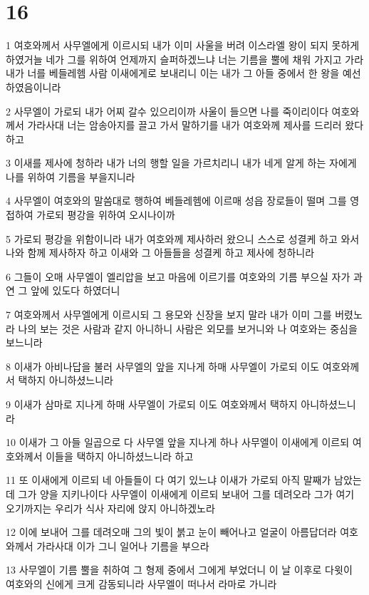 \chapter{16}

\par 1 여호와께서 사무엘에게 이르시되 내가 이미 사울을 버려 이스라엘 왕이 되지 못하게 하였거늘 네가 그를 위하여 언제까지 슬퍼하겠느냐 너는 기름을 뿔에 채워 가지고 가라 내가 너를 베들레헴 사람 이새에게로 보내리니 이는 내가 그 아들 중에서 한 왕을 예선하였음이니라
\par 2 사무엘이 가로되 내가 어찌 갈수 있으리이까 사울이 들으면 나를 죽이리이다 여호와께서 가라사대 너는 암송아지를 끌고 가서 말하기를 내가 여호와께 제사를 드리러 왔다 하고
\par 3 이새를 제사에 청하라 내가 너의 행할 일을 가르치리니 내가 네게 알게 하는 자에게 나를 위하여 기름을 부을지니라
\par 4 사무엘이 여호와의 말씀대로 행하여 베들레헴에 이르매 성읍 장로들이 떨며 그를 영접하여 가로되 평강을 위하여 오시나이까
\par 5 가로되 평강을 위함이니라 내가 여호와께 제사하러 왔으니 스스로 성결케 하고 와서 나와 함께 제사하자 하고 이새와 그 아들들을 성결케 하고 제사에 청하니라
\par 6 그들이 오매 사무엘이 엘리압을 보고 마음에 이르기를 여호와의 기름 부으실 자가 과연 그 앞에 있도다 하였더니
\par 7 여호와께서 사무엘에게 이르시되 그 용모와 신장을 보지 말라 내가 이미 그를 버렸노라 나의 보는 것은 사람과 같지 아니하니 사람은 외모를 보거니와 나 여호와는 중심을 보느니라
\par 8 이새가 아비나답을 불러 사무엘의 앞을 지나게 하매 사무엘이 가로되 이도 여호와께서 택하지 아니하셨느니라
\par 9 이새가 삼마로 지나게 하매 사무엘이 가로되 이도 여호와께서 택하지 아니하셨느니라
\par 10 이새가 그 아들 일곱으로 다 사무엘 앞을 지나게 하나 사무엘이 이새에게 이르되 여호와께서 이들을 택하지 아니하셨느니라 하고
\par 11 또 이새에게 이르되 네 아들들이 다 여기 있느냐 이새가 가로되 아직 말째가 남았는데 그가 양을 지키나이다 사무엘이 이새에게 이르되 보내어 그를 데려오라 그가 여기 오기까지는 우리가 식사 자리에 앉지 아니하겠노라
\par 12 이에 보내어 그를 데려오매 그의 빛이 붉고 눈이 빼어나고 얼굴이 아름답더라 여호와께서 가라사대 이가 그니 일어나 기름을 부으라
\par 13 사무엘이 기름 뿔을 취하여 그 형제 중에서 그에게 부었더니 이 날 이후로 다윗이 여호와의 신에게 크게 감동되니라 사무엘이 떠나서 라마로 가니라
